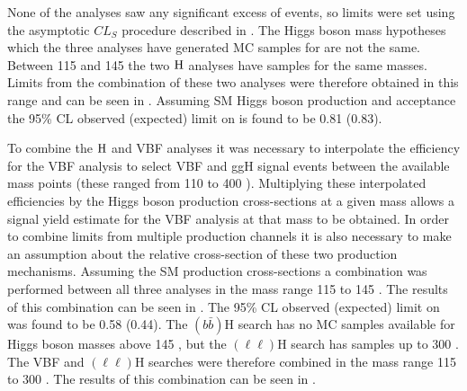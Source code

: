 None of the analyses saw any significant excess of events, so limits were set using the asymptotic $CL_{S}$ procedure described in . The Higgs boson mass hypotheses which the three analyses have generated \ac{MC} samples for are not the same. Between 115 and 145 \GeV the two \PZ$\rm{H}$ analyses have samples for the same masses. Limits from the combination of these two analyses were therefore obtained in this range and can be seen in . Assuming \ac{SM} Higgs boson production and acceptance the 95\% \ac{CL} observed (expected) limit on \BRinv is found to be 0.81 (0.83).

To combine the \PZ$\rm{H}$ and \ac{VBF} analyses it was necessary to interpolate the efficiency for the \ac{VBF} analysis to select \ac{VBF} and \ac{ggH} signal events between the available mass points (these ranged from 110 to 400 \GeV). Multiplying these interpolated efficiencies by the Higgs boson production cross-sections at a given mass allows a signal yield estimate for the \ac{VBF} analysis at that mass to be obtained. In order to combine limits from multiple production channels it is also necessary to make an assumption about the relative cross-section of these two production mechanisms. Assuming the \ac{SM} production cross-sections a combination was performed between all three analyses in the mass range 115 to 145 \GeV. The results of this combination can be seen in . The 95\% \ac{CL} observed (expected) limit on \BRinv was found to be 0.58 (0.44). The \PZ$(b\bar{b})$H search has no \ac{MC} samples available for Higgs boson masses above 145 \GeV, but the \PZ$(\ell\ell)$H search has samples up to 300 \GeV. The \ac{VBF} and \PZ$(\ell\ell)$H searches were therefore combined in the mass range 115 to 300 \GeV. The results of this combination can be seen in .

